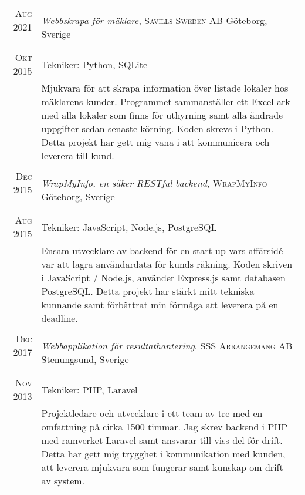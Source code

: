 \documentclass[a4paper,10pt]{scrartcl} %
\begin{document}
\begin{tabular}{r|p{15cm}}

\textsc{Aug 2021} |                 & \emph{Webbskrapa för mäklare}, \textsc{Savills Sweden AB} \hfill Göteborg, Sverige \\
\textsc{Okt 2015}                   & \footnotesize{Tekniker: Python, SQLite} \\
\phantom{abcdefghijklm}             & \footnotesize{Mjukvara för att skrapa information över listade lokaler hos mäklarens kunder. Programmet sammanställer ett Excel-ark med alla lokaler som finns för uthyrning samt alla ändrade uppgifter sedan senaste körning. Koden skrevs i Python. Detta projekt har gett mig vana i att kommunicera och leverera till kund.}\\
\multicolumn{2}{c}{} \\


\textsc{Dec 2015} |	                & \emph{WrapMyInfo, en säker RESTful backend}, \textsc{WrapMyInfo} \hfill Göteborg, Sverige \\
\textsc{Aug 2015} 	                & \footnotesize{Tekniker: JavaScript, Node.js, PostgreSQL} \\
					                & \footnotesize{Ensam utvecklare av backend för en start up vars affärsidé var att lagra användardata för kunds räkning. Koden skriven i JavaScript / Node.js, använder Express.js samt databasen PostgreSQL. Detta projekt har stärkt mitt tekniska kunnande samt förbättrat min förmåga att leverera på en deadline.}\\
\multicolumn{2}{c}{} \\


\textsc{Dec 2017} |  	            & \emph{Webbapplikation för resultathantering}, \textsc{SSS Arrangemang AB} \hfill Stenungsund, Sverige \\
\textsc{Nov 2013}                   & \footnotesize{Tekniker: PHP, Laravel} \\
					                & \footnotesize{Projektledare och utvecklare i ett team av tre med en omfattning på cirka 1500 timmar. Jag skrev backend i PHP med ramverket Laravel samt ansvarar till viss del för drift. Detta har gett mig trygghet i kommunikation med kunden, att leverera mjukvara som fungerar samt kunskap om drift av system.}\\
\end{tabular}
\end{document}

